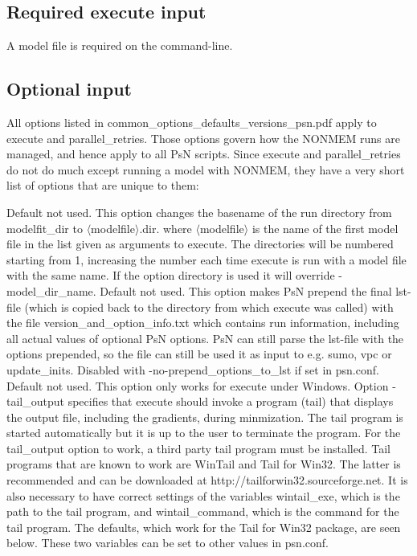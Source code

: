\subsection{Required execute input}
A model file is required on the command-line.

\subsection{Optional input}
All options listed in common\_options\_defaults\_versions\_psn.pdf apply to execute and parallel\_retries. 
Those options govern how the NONMEM runs are managed, and hence apply to all PsN scripts.
Since execute and parallel\_retries do not do much except running a model with NONMEM, 
they have a very short list of options that are unique to them:

\begin{optionlist}
Default not used. This option changes the basename of the run directory from modelfit\_dir to $\langle$modelfile$\rangle$.dir. where $\langle$modelfile$\rangle$ is the name of the first model file in the list given as arguments to execute. The directories will be numbered starting from 1, increasing the number each time execute is run with a model file with the same name. If the option directory is used it will override -model\_dir\_name.
\nextopt
{}
Default not used. This option makes PsN prepend the final lst-file (which is copied back to the directory from which execute was called) with the file version\_and\_option\_info.txt which contains run information, including     all actual values of optional PsN options. PsN can still parse the lst-file with the options prepended, so the file can still be used it as input to e.g. sumo, vpc or update\_inits. Disabled with -no-prepend\_options\_to\_lst if set in psn.conf.
\nextopt
{}
Default not used. This option only works for execute under Windows. Option -tail\_output specifies that execute should invoke a program (tail) that displays the output file, including the gradients, during minmization. The tail program is started automatically but it is up to the user to terminate the program. For the tail\_output option to work, a third party tail program must be installed. Tail programs that are known to work are WinTail and Tail for Win32.  The latter is recommended and can be downloaded at http://tailforwin32.sourceforge.net. It is also necessary to have correct settings of the variables wintail\_exe, which is the path to the tail program, and wintail\_command, which is the command for the tail program. The defaults, which work for the Tail for Win32 package, are seen below. These two variables can be set to other values in psn.conf.

\end{optionlist}
